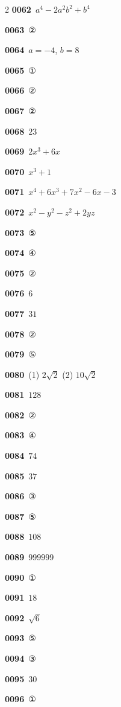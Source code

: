 \documentclass[10pt,a4paper]{article}
\begin{document}
\begin{multicols}{2}
\noindent\textbf{0062}\ $a^4-2a^2b^2+b^4$\par
\noindent\textbf{0063}\ ②\par
\noindent\textbf{0064}\ $a=-4$, $b=8$\par
\noindent\textbf{0065}\ ①\par
\noindent\textbf{0066}\ ②\par
\noindent\textbf{0067}\ ②\par
\noindent\textbf{0068}\ $23$\par
\noindent\textbf{0069}\ $2x^3+6x$\par
\noindent\textbf{0070}\ $x^3+1$\par
\noindent\textbf{0071}\ $x^4+6x^3+7x^2-6x-3$\par
\noindent\textbf{0072}\ $x^2-y^2-z^2+2yz$\par
\noindent\textbf{0073}\ ⑤\par
\noindent\textbf{0074}\ ④\par
\noindent\textbf{0075}\ ②\par
\noindent\textbf{0076}\ $6$\par
\noindent\textbf{0077}\ $31$\par
\noindent\textbf{0078}\ ②\par
\noindent\textbf{0079}\ ⑤\par
\noindent\textbf{0080}\ (1) $2\sqrt{2}$ (2) $10\sqrt{2}$\par
\noindent\textbf{0081}\ $128$\par
\noindent\textbf{0082}\ ②\par
\noindent\textbf{0083}\ ④\par
\noindent\textbf{0084}\ $74$\par
\noindent\textbf{0085}\ $37$\par
\noindent\textbf{0086}\ ③\par
\noindent\textbf{0087}\ ⑤\par
\noindent\textbf{0088}\ $108$\par
\noindent\textbf{0089}\ $999999$\par
\noindent\textbf{0090}\ ①\par
\noindent\textbf{0091}\ $18$\par
\noindent\textbf{0092}\ $\sqrt{6}$\par
\noindent\textbf{0093}\ ⑤\par
\noindent\textbf{0094}\ ③\par
\noindent\textbf{0095}\ $30$\par
\noindent\textbf{0096}\ ①\par

\end{multicols}
\end{document}
